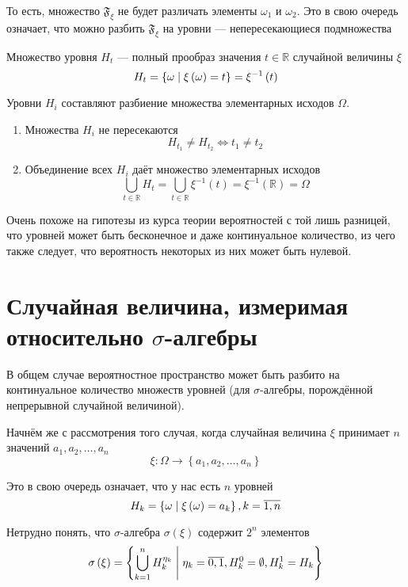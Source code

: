 То есть, множество $\mathfrak{F}_\xi$ не будет различать
элементы $\omega_1$ и $\omega_2$.
Это в свою очередь означает, что можно разбить $\mathfrak{F}_\xi$
на уровни --- непересекающиеся подмножества

\begin{definition}
  Множество уровня $H_t$ --- полный прообраз
  значения $t\in\mathbb{R}$ случайной величины $\xi$
  $$H_t
      = \left\{ \omega \;\middle|\; \xi\left( \omega \right) = t \right\}
      = \xi^{-1}\left( t \right)$$
\end{definition}

\begin{remark}
  Уровни $H_i$ составляют разбиение множества элементарных исходов $\Omega$.
  \begin{enumerate}
      \item Множества $H_i$ не пересекаются
      $$H_{t_1} \neq H_{t_2} \Leftrightarrow t_1 \neq t_2$$
      \item Объединение всех $H_i$ даёт множество элементарных исходов
      $$\bigcup_{t \in \mathbb{R}} H_t
          = \bigcup_{t \in \mathbb{R}} \xi^{-1}\left( t \right)
          = \xi^{-1}\left( \mathbb{R} \right)
          = \Omega$$
  \end{enumerate}
\end{remark}

Очень похоже на гипотезы из курса теории вероятностей с той лишь разницей,
что уровней может быть бесконечное и даже континуальное количество,
из чего также следует, что вероятность некоторых из них может быть нулевой.

\section{Случайная величина, измеримая относительно $\sigma$-алгебры}
В общем случае вероятностное пространство может быть разбито
на континуальное количество множеств уровней
(для $\sigma$-алгебры, порождённой непрерывной случайной величиной).

Начнём же с рассмотрения того случая,
когда случайная величина $\xi$ принимает $n$ значений
$a_1, a_2, \dots, a_n$
$$\xi: \Omega \rightarrow \left\{ a_1, a_2, \dots, a_n \right\}$$

Это в свою очередь означает, что у нас есть $n$ уровней
$$H_k = \left\{ \omega \;\middle|\; \xi\left( \omega \right) = a_k \right\},
  k= \overline{1,n}$$

Нетрудно понять,
что $\sigma$-алгебра $\sigma\left( \xi \right)$ содержит $2^n$ элементов
$$\sigma\left( \xi \right) = \left\{ \bigcup_{k=1}^n H_k^{\eta_k}
  \;\middle|\; \eta_k = \overline{0,1}, H_k^0 = \emptyset, H_k^1 = H_k \right\}$$

